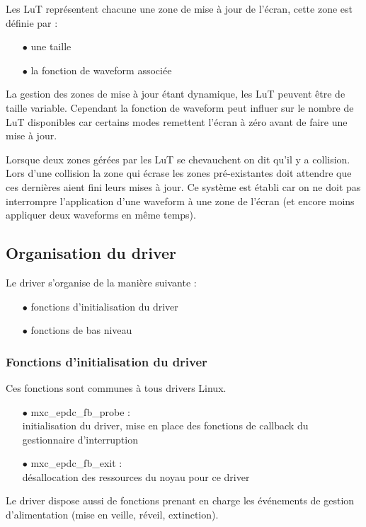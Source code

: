 Les LuT représentent chacune une zone de mise à jour de l'écran, cette zone est définie par : 
	\begin{itemize}
		\item[$\bullet$] une taille
		\item[$\bullet$] la fonction de waveform associée
	\end{itemize}
La gestion des zones de mise à jour étant dynamique, les LuT peuvent être de taille variable. Cependant la fonction de waveform peut influer sur le nombre de LuT disponibles car certains modes remettent l'écran à zéro avant de faire une mise à jour.

Lorsque deux zones gérées par les LuT se chevauchent on dit qu'il y a collision. Lors d'une collision 
la zone qui écrase les zones pré-existantes doit attendre que ces dernières aient fini leurs mises à jour. Ce système est établi car on ne doit pas interrompre l'application d'une waveform à une zone de l'écran (et encore moins appliquer deux waveforms en même temps).
\subsection{Organisation du driver}

Le driver s'organise de la manière suivante : 
	\begin{itemize}
		\item[$\bullet$] fonctions d'initialisation du driver
		\item[$\bullet$] fonctions de bas niveau
	\end{itemize}
	
\subsubsection{Fonctions d'initialisation du driver} %

	Ces fonctions sont communes à tous drivers Linux.
	\begin{itemize}
		\item[$\bullet$] mxc\_epdc\_fb\_probe : \\
		initialisation du driver, mise en place des fonctions de callback du gestionnaire d'interruption
		\item[$\bullet$] mxc\_epdc\_fb\_exit :\\
		désallocation des ressources du noyau pour ce driver
	\end{itemize}
	Le driver dispose aussi de fonctions prenant en charge les événements de gestion d'alimentation (mise en veille, réveil, extinction).
	
